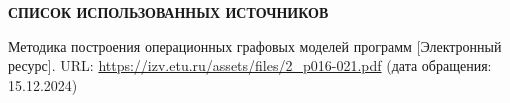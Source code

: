 \renewcommand{\bibname}{}
\begin{thebibliography}{6}
\renewcommand{\bibname}{СПИСОК ИСПОЛЬЗОВАННЫХ ИСТОЧНИКОВ}
\makeatletter
\renewcommand{\@biblabel}[1]{#1.}
\makeatother
\begin{center}
    \textbf{\bibname}
\end{center}
     Методика построения операционных графовых моделей программ [Электронный ресурс]. URL: \url{https://izv.etu.ru/assets/files/2_p016-021.pdf} (дата обращения: 15.12.2024)
\end{thebibliography}